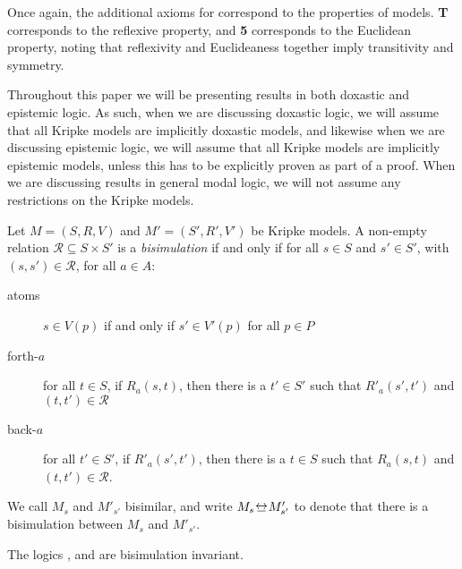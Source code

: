 Once again, the additional axioms for \axiomS{} correspond to the properties of
\classS{} models. {\bf T} corresponds to the reflexive property, and {\bf 5}
corresponds to the Euclidean property, noting that reflexivity and Euclideaness
together imply transitivity and symmetry.


Throughout this paper we will be presenting results in both doxastic and
epistemic logic.  As such, when we are discussing doxastic logic, we will
assume that all Kripke models are implicitly doxastic models, and likewise when
we are discussing epistemic logic, we will assume that all Kripke models are
implicitly epistemic models, unless this has to be explicitly proven as part of
a proof. When we are discussing results in general modal logic, we will not
assume any restrictions on the Kripke models.

\begin{definition}[Bisimulation]
Let $M = (S, R, V)$ and $M' = (S', R', V')$ be Kripke models. A non-empty
relation $\mathcal{R} \subseteq S \times S'$ is a \textit{bisimulation} if and
only if for all $s \in S$ and $s' \in S'$, with $(s, s') \in \mathcal{R}$, for
all $a \in A$:

\begin{description}
\item[atoms] $s \in V(p)$ if and only if $s' \in V'(p)$ for all
$p \in P$

\item[forth-$a$] for all $t \in S$, if $R_a(s, t)$, then there is a
$t' \in S'$ such that $R'_a(s', t')$ and $(t,
t') \in \mathcal{R}$

\item[back-$a$] for all $t' \in S'$, if $R'_a(s',
t')$, then there is a $t \in S$ such that $R_a(s, t)$ and $(t, t')
\in \mathcal{R}$.
\end{description}

We call $M_s$ and $M'_{s'}$ bisimilar, and write $M_s \bisim M'_{s'}$ to denote
that there is a bisimulation between $M_s$ and $M'_{s'}$.
\end{definition}

\begin{lemma}
The logics \logicK{}, \logicKD{} and \logicS{} are bisimulation invariant.
\end{lemma}


